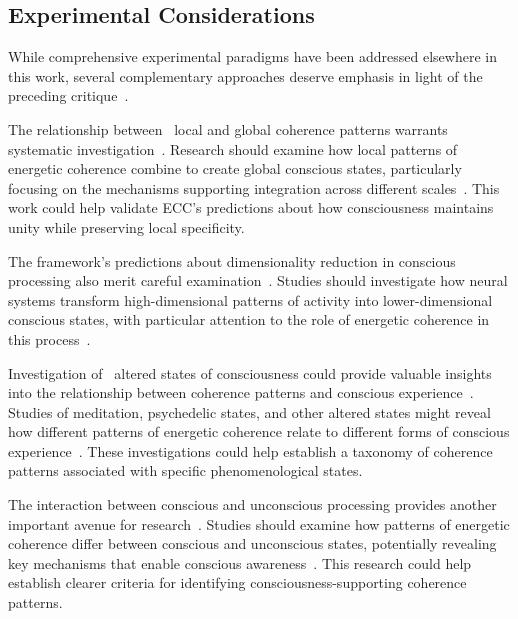 \subsection*{Experimental Considerations}

While comprehensive experimental paradigms have been addressed elsewhere in this work, several complementary approaches deserve emphasis in light of the preceding critique~\cite{seth2021being, varela2016embodied}.

The relationship between~ local and global coherence patterns warrants systematic investigation~\cite{feinberg2016ancient, zahavi2014self}. Research should examine how local patterns of energetic coherence combine to create global conscious states, particularly focusing on the mechanisms supporting integration across different scales~\cite{haken2013principles, thompson2014waking}. This work could help validate ECC's predictions about how consciousness maintains~ unity while preserving local specificity.

The framework's predictions about dimensionality reduction in conscious processing also merit careful examination~\cite{merleau2012phenomenology, tononi2016integrated}. Studies should investigate how neural systems transform high-dimensional patterns of activity into lower-dimensional conscious states, with particular attention to the role of energetic coherence in this process~\cite{carhart2014entropic}.

Investigation of~ altered states of consciousness could provide valuable insights into the relationship between coherence patterns and conscious experience~\cite{goff2019galileo, carhart2014entropic}. Studies of meditation, psychedelic states, and other altered states might reveal how different patterns of energetic coherence relate to different forms of conscious experience~\cite{thompson2014waking, pinotsis2023vivo}. These investigations could help establish a taxonomy of coherence patterns associated with specific phenomenological states.

The interaction between conscious and unconscious processing provides another important avenue for research~\cite{noe2009out, gibson2015ecological}. Studies should examine how patterns of energetic coherence differ between conscious and unconscious states, potentially revealing key mechanisms that enable conscious awareness~\cite{koch2019feeling, Dehaene2014}. This research could help establish clearer criteria for identifying consciousness-supporting coherence patterns.

